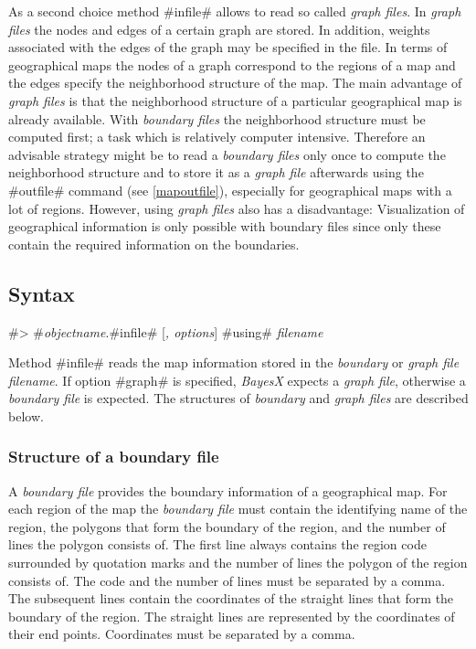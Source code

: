 As a second choice method #infile# allows to read  so called {\em
graph files}. In {\em graph files} the nodes and edges of a
certain graph are stored. In addition, weights associated with the
edges of the graph may be specified in the file. In terms of
geographical maps the nodes of a graph correspond to the regions
of a map and the edges specify the neighborhood structure of the
map. The main advantage of {\em graph files} is that the
neighborhood structure of a particular geographical map is already
available. With {\em boundary files} the neighborhood structure
must be computed first; a task which is relatively computer
intensive. Therefore an advisable strategy might be to read a {\em
boundary files} only once to compute the neighborhood structure
and to store it as a {\em graph file} afterwards using the
#outfile# command (see \autoref{mapoutfile}), especially for
geographical maps with a lot of regions. However, using {\em graph
files} also has a disadvantage: Visualization of geographical
information is only possible with boundary files since only these
contain the required information on the boundaries.

\subsection{Syntax}

#> #{\em objectname}.#infile# [{\em , options}] #using# {\em filename}

Method #infile# reads the map information stored in the {\em
boundary} or {\em graph file} {\em filename}. If option #graph# is
specified, {\em BayesX} expects a {\em graph file}, otherwise a
{\em boundary file}
is expected. The structures of {\em boundary} and {\em graph files} are described below.

\subsubsection*{Structure of a boundary file}

A {\em boundary file} provides the boundary information of a
geographical map. For each region of the map the {\em boundary
file} must contain the identifying name of the region, the
polygons that form the boundary of the region, and the number of
lines the polygon consists of. The first line always contains the
region code surrounded by quotation marks and the number of lines
the polygon of the region consists of. The code and the number of
lines must be separated by a comma. The subsequent lines contain
the coordinates of the straight lines that form the boundary of
the region. The straight lines are represented by the coordinates
of their end points. Coordinates must be separated by a comma.

